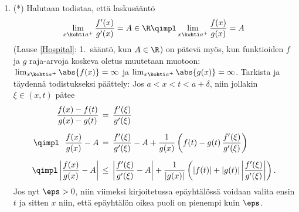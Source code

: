 \begin{enumerate}
\item (*) \label{H-V-6: Hospital 3}
Halutaan todistaa, että laskusääntö 
\[
\lim_{x \kohti a^+} \frac{f'(x)}{g'(x)} = A\in\R \qimpl
\lim_{x \kohti a^+} \frac{f(x)}{g(x)} = A
\]
(Lause \ref{Hospital}: 1.\ sääntö, kun $A\in\R$) on pätevä myös, kun funktioiden $f$ ja $g$
raja-arvoja koskeva oletus muutetaan muotoon: $\,\lim_{x \kohti a^+}\abs{f(x)}=\infty$ ja
$\lim_{x \kohti a^+}\abs{g(x)}=\infty$. Tarkista ja täydennä todistukseksi päättely: \newline
Jos $a<x<t<a+\delta$, niin jollakin $\xi\in(x,t)$ pätee
\begin{align*}
\frac{f(x)-f(t)}{g(x)-g(t)}\,
  &=\, \frac{f'(\xi)}{g'(\xi)} \\[2mm]
\qimpl\ \ \frac{f(x)}{g(x)}-A\,
  &=\, \frac{f'(\xi)}{g'(\xi)}-A
     + \frac{1}{g(x)}\left(f(t)-g(t)\,\frac{f'(\xi)}{g'(\xi)}\right) \\[2mm]
\qimpl \left|\frac{f(x)}{g(x)}-A\right|\,
  &\le\, \left|\frac{f'(\xi)}{g'(\xi)}-A\right|
       + \frac{1}{|g(x)|}\left(|f(t)|+|g(t)|\left|\frac{f'(\xi)}{g'(\xi)}\right|\right).
\end{align*}
Jos nyt $\eps>0$, niin viimeksi kirjoitetussa epäyhtälössä voidaan valita ensin $t$ ja sitten
$x$ niin, että epäyhtälön oikea puoli on pienempi kuin $\eps$.

\end{enumerate}